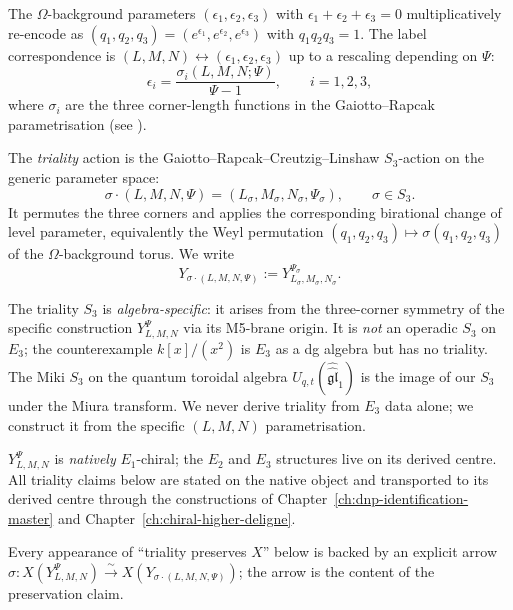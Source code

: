 The $\Omega$-background parameters $(\epsilon_1, \epsilon_2, \epsilon_3)$
with $\epsilon_1 + \epsilon_2 + \epsilon_3 = 0$ multiplicatively
re-encode as $(q_1, q_2, q_3) = (e^{\epsilon_1}, e^{\epsilon_2}, e^{\epsilon_3})$
with $q_1 q_2 q_3 = 1$. The label correspondence is $(L,M,N) \leftrightarrow
(\epsilon_1, \epsilon_2, \epsilon_3)$ up to a rescaling depending on
$\Psi$:
\begin{equation}
\label{eq:y-algebra-level}
\epsilon_i = \frac{\sigma_i(L,M,N; \Psi)}{\Psi - 1}, \qquad i = 1,2,3,
\end{equation}
where $\sigma_i$ are the three corner-length functions in the
Gaiotto--Rapcak parametrisation (see
\cite[Eq.~3.8]{GaiottoRapcak2017}).

\begin{definition}
\label{def:triality-S3}
The \emph{triality} action is the Gaiotto--Rapcak--Creutzig--Linshaw
$S_3$-action on the generic parameter space:
\[
  \sigma\cdot(L,M,N,\Psi)=(L_\sigma,M_\sigma,N_\sigma,\Psi_\sigma),
  \qquad \sigma\in S_3 .
\]
It permutes the three corners and applies the corresponding birational
change of level parameter, equivalently the Weyl permutation
$(q_1,q_2,q_3)\mapsto\sigma(q_1,q_2,q_3)$ of the $\Omega$-background
torus. We write
\[
  Y_{\sigma\cdot(L,M,N,\Psi)}
  :=
  Y_{L_\sigma,M_\sigma,N_\sigma}^{\Psi_\sigma}.
\]
\end{definition}

\begin{remark}
\label{rem:triality-scope}
The triality $S_3$ is \emph{algebra-specific}: it arises from the
three-corner symmetry of the specific construction
$Y_{L,M,N}^\Psi$ via its M5-brane origin. It is \emph{not} an
operadic $S_3$ on $E_3$; the counterexample $k[x]/(x^2)$ is
$E_3$ as a dg algebra but has no triality. The Miki $S_3$ on the
quantum toroidal algebra $U_{q,t}(\widehat{\widehat{\mathfrak{gl}}}_1)$
is the image of our $S_3$ under the Miura transform. We never derive
triality from $E_3$ data alone; we construct it from the specific
$(L,M,N)$ parametrisation.

$Y_{L,M,N}^\Psi$ is \emph{natively} $E_1$-chiral; the $E_2$
and $E_3$ structures live on its derived centre. All triality claims
below are stated on the native object and transported to its derived
centre through the constructions of
Chapter~\ref{ch:dnp-identification-master} and
Chapter~\ref{ch:chiral-higher-deligne}.

Every appearance of ``triality preserves $X$'' below is backed by an
explicit arrow $\sigma: X(Y_{L,M,N}^\Psi) \xrightarrow{\sim}
X(Y_{\sigma\cdot(L,M,N,\Psi)})$; the arrow is the content of the
preservation claim.
\end{remark}

